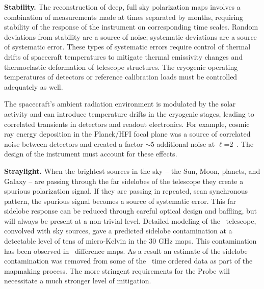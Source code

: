 \textbf{Stability.}  %
The reconstruction of deep, full sky polarization maps involves a combination of measurements made at times
separated by months, requiring stability of the response of the instrument on corresponding time scales.  
Random deviations
from stability are a source of noise; systematic deviations are a source of systematic error. 
These types of systematic errors require control of thermal drifts of spacecraft temperatures to
mitigate thermal emissivity changes and thermoelastic deformation of telescope structures.  
The cryogenic operating temperatures of detectors or reference calibration loads must be controlled
adequately as well. 

The spacecraft's ambient radiation environment is modulated by the solar activity and
can introduce temperature drifts in the cryogenic stages, leading to correlated transients in detectors and readout electronics.  
For example, cosmic ray energy deposition in the Planck/HFI focal plane was a source of 
correlated noise between detectors and created a factor $\sim$5 
additional noise at $\ell$=2~\cite{planck2016_xlvi}.
The design of the instrument must account for these effects.

\textbf{Straylight.}   When the brightest sources in the sky -- the Sun, Moon, planets, and Galaxy --
are passing through the far sidelobes of the telescope they create a spurious polarization signal. If they are 
passing in repeated, scan synchronous pattern, the spurious signal becomes a source of systematic error. 
This far sidelobe response can be reduced through careful optical design and baffling, but will always be present 
at a non-trivial level.  Detailed modeling of the \planck\ telescope, convolved with sky sources, gave 
a predicted sidelobe contamination at a detectable level of tens of micro-Kelvin in the 30 GHz maps.  This
contamination has been observed in \planck\ difference maps.  
As a result an estimate of the sidelobe contamination was removed from some of the \planck\ time ordered data 
as part of the mapmaking process. The more stringent requirements for the Probe will necessitate a much 
stronger level of mitigation.  

